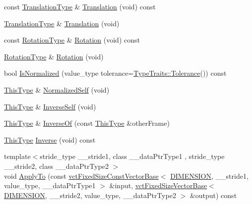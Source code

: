 \begin{DoxyCompactItemize}
\item 
const \hyperlink{classvct_frame_base_a4c397a93b65f0c38e75e99ff3a659c23}{Translation\-Type} \& \hyperlink{classvct_frame_base_a56ec390e951c631d38c32241687a3f21}{Translation} (void) const 
\item 
\hyperlink{classvct_frame_base_a4c397a93b65f0c38e75e99ff3a659c23}{Translation\-Type} \& \hyperlink{classvct_frame_base_a06304d635d0c75472a16fdf3b7791083}{Translation} (void)
\item 
const \hyperlink{classvct_frame_base_a02e4eaad478400dd1d81e772caf3b01b}{Rotation\-Type} \& \hyperlink{classvct_frame_base_a227f550b0ef97f4894432dcdfd001868}{Rotation} (void) const 
\item 
\hyperlink{classvct_frame_base_a02e4eaad478400dd1d81e772caf3b01b}{Rotation\-Type} \& \hyperlink{classvct_frame_base_ad7d5e4d840285bcff027421c2ec458fe}{Rotation} (void)
\item 
bool \hyperlink{classvct_frame_base_a6e14357724f75d4bc7a60631028b23c1}{Is\-Normalized} (value\-\_\-type tolerance=\hyperlink{classcmn_type_traits_adc129bf9867295b90d300768b780fa99}{Type\-Traits\-::\-Tolerance}()) const 
\item 
\hyperlink{classvct_frame_base_a076f1fe4fc957faa0d1ff7450d1cb768}{This\-Type} \& \hyperlink{classvct_frame_base_ac7b9a5588944d681cd48193749cdd6d3}{Normalized\-Self} (void)
\item 
\hyperlink{classvct_frame_base_a076f1fe4fc957faa0d1ff7450d1cb768}{This\-Type} \& \hyperlink{classvct_frame_base_aec5d08a21958fe3ef38f700ea3ff7997}{Inverse\-Self} (void)
\item 
\hyperlink{classvct_frame_base_a076f1fe4fc957faa0d1ff7450d1cb768}{This\-Type} \& \hyperlink{classvct_frame_base_abd9f3211a54590d58a5d5d4a520de833}{Inverse\-Of} (const \hyperlink{classvct_frame_base_a076f1fe4fc957faa0d1ff7450d1cb768}{This\-Type} \&other\-Frame)
\item 
\hyperlink{classvct_frame_base_a076f1fe4fc957faa0d1ff7450d1cb768}{This\-Type} \hyperlink{classvct_frame_base_a2bc4ed6a64789bc0ee3860bc22605c1a}{Inverse} (void) const 
\item 
{\footnotesize template$<$stride\-\_\-type \-\_\-\-\_\-stride1, class \-\_\-\-\_\-data\-Ptr\-Type1 , stride\-\_\-type \-\_\-\-\_\-stride2, class \-\_\-\-\_\-data\-Ptr\-Type2 $>$ }\\void \hyperlink{classvct_frame_base_a4c6f380960a15eeb88d24f345c28eed3}{Apply\-To} (const \hyperlink{classvct_fixed_size_const_vector_base}{vct\-Fixed\-Size\-Const\-Vector\-Base}$<$ \hyperlink{classvct_frame_base_a4284a4e875533c13df90a20c0233e043ad25b85efd5e4c2687ddf38ae18cd88f0}{D\-I\-M\-E\-N\-S\-I\-O\-N}, \-\_\-\-\_\-stride1, value\-\_\-type, \-\_\-\-\_\-data\-Ptr\-Type1 $>$ \&input, \hyperlink{classvct_fixed_size_vector_base}{vct\-Fixed\-Size\-Vector\-Base}$<$ \hyperlink{classvct_frame_base_a4284a4e875533c13df90a20c0233e043ad25b85efd5e4c2687ddf38ae18cd88f0}{D\-I\-M\-E\-N\-S\-I\-O\-N}, \-\_\-\-\_\-stride2, value\-\_\-type, \-\_\-\-\_\-data\-Ptr\-Type2 $>$ \&output) const 

\end{DoxyCompactItemize}

